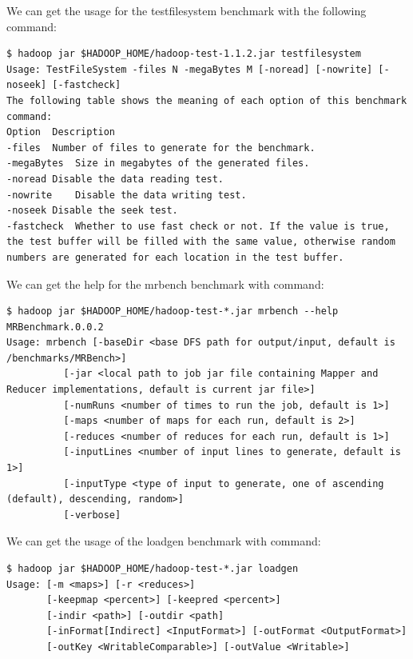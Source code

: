 We can get the usage for the testfilesystem benchmark with the following command:
\lstset{style=bashstyle}
\begin{lstlisting}
$ hadoop jar $HADOOP_HOME/hadoop-test-1.1.2.jar testfilesystem
Usage: TestFileSystem -files N -megaBytes M [-noread] [-nowrite] [-noseek] [-fastcheck]
The following table shows the meaning of each option of this benchmark command:
Option	Description
-files	Number of files to generate for the benchmark.
-megaBytes	Size in megabytes of the generated files.
-noread	Disable the data reading test.
-nowrite	Disable the data writing test.
-noseek	Disable the seek test.
-fastcheck	Whether to use fast check or not. If the value is true, the test buffer will be filled with the same value, otherwise random numbers are generated for each location in the test buffer.
\end{lstlisting}

We can get the help for the mrbench benchmark with command:
\lstset{style=bashstyle}
\begin{lstlisting}
$ hadoop jar $HADOOP_HOME/hadoop-test-*.jar mrbench --help
MRBenchmark.0.0.2
Usage: mrbench [-baseDir <base DFS path for output/input, default is /benchmarks/MRBench>]
          [-jar <local path to job jar file containing Mapper and Reducer implementations, default is current jar file>]
          [-numRuns <number of times to run the job, default is 1>]
          [-maps <number of maps for each run, default is 2>]
          [-reduces <number of reduces for each run, default is 1>]
          [-inputLines <number of input lines to generate, default is 1>]
          [-inputType <type of input to generate, one of ascending (default), descending, random>]
          [-verbose]
\end{lstlisting}

We can get the usage of the loadgen benchmark with command:
\lstset{style=bashstyle}
\begin{lstlisting}
$ hadoop jar $HADOOP_HOME/hadoop-test-*.jar loadgen
Usage: [-m <maps>] [-r <reduces>]
       [-keepmap <percent>] [-keepred <percent>]
       [-indir <path>] [-outdir <path]
       [-inFormat[Indirect] <InputFormat>] [-outFormat <OutputFormat>]
       [-outKey <WritableComparable>] [-outValue <Writable>]
\end{lstlisting}


